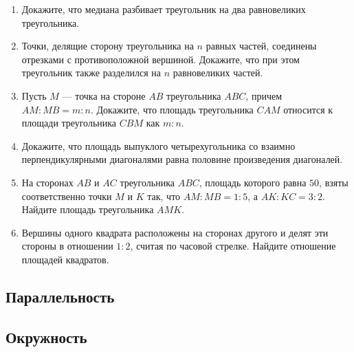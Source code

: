 \documentclass[10pt, a4paper]{article}
\begin{document}
\begin{enumerate}
		\item Докажите, что медиана разбивает треугольник на два равновеликих треугольника.
		\item Точки, делящие сторону треугольника на $n$ равных частей, соединены отрезками с противоположной вершиной. Докажите, что при этом треугольник также разделился на $n$ равновеликих частей.
		\item Пусть $M$ — точка на стороне $AB$ треугольника $ABC$, причем $AM : MB = m : n$. Докажите, что площадь треугольника $CAM$ относится к площади треугольника $CBM$ как $m : n$.
		\item Докажите, что площадь выпуклого четырехугольника со взаимно перпендикулярными диагоналями равна половине произведения диагоналей.
		\item На сторонах $AB$ и $AC$ треугольника $ABC$, площадь которого равна $50$, взяты соответственно точки $M$ и $K$ так, что $AM : MB = 1 : 5$, а $AK : KC = 3 : 2$. Найдите площадь треугольника $AMK$.
		\item Вершины одного квадрата расположены на сторонах другого и делят эти стороны в отношении $1 : 2$, считая по часовой стрелке. Найдите отношение площадей квадратов.
	\end{enumerate}
\subsection{Параллельность}
\subsection{Окружность}
\end{document}
